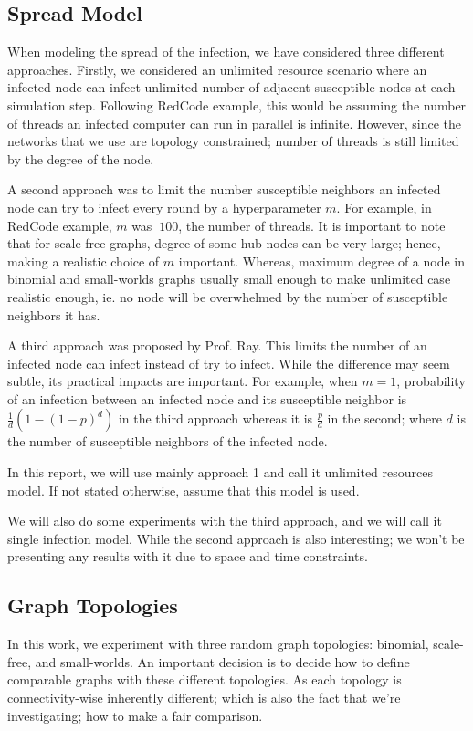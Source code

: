 \documentclass[conference]{IEEEtran}
\begin{document}
\subsection{Spread Model}\label{sec:spread_model}

When modeling the spread of the infection, we have considered three different approaches. Firstly, we considered an unlimited resource scenario where an infected node can infect unlimited number of adjacent susceptible nodes at each simulation step. Following RedCode example, this would be assuming the number of threads an infected computer can run in parallel is infinite. However, since the networks that we use are topology constrained; number of threads is still limited by the degree of the node.

A second approach was to limit the number susceptible neighbors an infected node can try to infect every round by a hyperparameter $m$. For example, in RedCode example, $m$ was $~100$, the number of threads. It is important to note that for scale-free graphs, degree of some hub nodes can be very large; hence, making a realistic choice of $m$ important. Whereas, maximum degree of a node in binomial and small-worlds graphs usually small enough to make unlimited case realistic enough, ie. no node will be overwhelmed by the number of susceptible neighbors it has.

A third approach was proposed by Prof. Ray. This limits the number of an infected node can infect instead of try to infect. While the difference may seem subtle, its practical impacts are important. For example, when $m=1$, probability of an infection between an infected node and its susceptible neighbor is $\frac{1}{d}(1-(1-p)^d)$ in the third approach whereas it is $\frac{p}{d}$ in the second; where $d$ is the number of susceptible neighbors of the infected node.

In this report, we will use mainly approach 1 and call it unlimited resources model. If not stated otherwise, assume that this model is used.

We will also do some experiments with the third approach, and we will call it single infection model. While the second approach is also interesting; we won't be presenting any results with it due to space and time constraints.

\subsection{Graph Topologies}

In this work, we experiment with three random graph topologies: binomial, scale-free, and small-worlds. An important decision is
to decide how to define comparable graphs with these different topologies. As each topology is connectivity-wise inherently different; which is also the fact that we're investigating; how to make a fair comparison.
\end{document}
